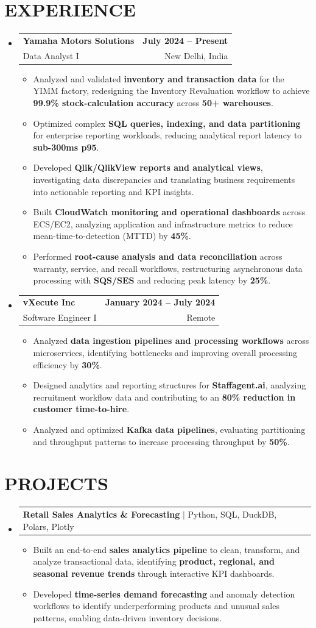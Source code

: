 \documentclass[letterpaper,10pt]{article}
\makeatletter
\renewcommand{\normalsize}{%
  \fontsize{10.1}{12.25}\selectfont
}
\newcommand{\resumeItem}[1]{
  \item\normalsize{
    {#1}
  }
}
\newcommand{\resumeSubheading}[4]{
  \item
    \begin{tabular*}{1.0\textwidth}[t]{l@{\extracolsep{\fill}}r}
      \textbf{\normalsize#1} & \textbf{\normalsize#2} \\
      {\normalsize#3} & {\normalsize#4} \\
    \end{tabular*}\vspace{1pt}
}
\newcommand{\resumeProjectHeading}[2]{
  \item
    \begin{tabular*}{1.0\textwidth}{l@{\extracolsep{\fill}}r}
      \normalsize#1 & \textbf{\normalsize#2}\\
    \end{tabular*}\vspace{2pt}
}
\newcommand{\resumeSubHeadingListStart}{\begin{itemize}[leftmargin=0.0in, label={}, itemsep=6pt, topsep=2pt]}
\newcommand{\resumeSubHeadingListEnd}{\end{itemize}}
\newcommand{\resumeItemListStart}{\begin{itemize}}
\newcommand{\resumeItemListEnd}{\end{itemize}\vspace{-3pt}}
\makeatother
\begin{document}
\section{EXPERIENCE}
  \resumeSubHeadingListStart

    \resumeSubheading
      {Yamaha Motors Solutions}{July 2024 -- Present}
      {Data Analyst I}{New Delhi, India}
      \resumeItemListStart
        \resumeItem{Analyzed and validated \textbf{inventory and transaction data} for the YIMM factory, redesigning the Inventory Revaluation workflow to achieve \textbf{99.9\% stock-calculation accuracy} across \textbf{50+ warehouses}.}
        \resumeItem{Optimized complex \textbf{SQL queries, indexing, and data partitioning} for enterprise reporting workloads, reducing analytical report latency to \textbf{sub-300ms p95}.}
        \resumeItem{Developed \textbf{Qlik/QlikView reports and analytical views}, investigating data discrepancies and translating business requirements into actionable reporting and KPI insights.}
        \resumeItem{Built \textbf{CloudWatch monitoring and operational dashboards} across ECS/EC2, analyzing application and infrastructure metrics to reduce mean-time-to-detection (MTTD) by \textbf{45\%}.}
        \resumeItem{Performed \textbf{root-cause analysis and data reconciliation} across warranty, service, and recall workflows, restructuring asynchronous data processing with \textbf{SQS/SES} and reducing peak latency by \textbf{25\%}.}
      \resumeItemListEnd

    \resumeSubheading
      {vXecute Inc}{January 2024 -- July 2024}
      {Software Engineer I}{Remote}
      \resumeItemListStart
        \resumeItem{Analyzed \textbf{data ingestion pipelines and processing workflows} across microservices, identifying bottlenecks and improving overall processing efficiency by \textbf{30\%}.}
        \resumeItem{Designed analytics and reporting structures for \textbf{Staffagent.ai}, analyzing recruitment workflow data and contributing to an \textbf{80\% reduction in customer time-to-hire}.}
        \resumeItem{Analyzed and optimized \textbf{Kafka data pipelines}, evaluating partitioning and throughput patterns to increase processing throughput by \textbf{50\%}.}
      \resumeItemListEnd

  \resumeSubHeadingListEnd

\section{PROJECTS}
  \resumeSubHeadingListStart
    \resumeProjectHeading
      {\textbf{Retail Sales Analytics \& Forecasting} $|$ \textnormal{Python, SQL, DuckDB, Polars, Plotly}}{}
      \resumeItemListStart
        \resumeItem{Built an end-to-end \textbf{sales analytics pipeline} to clean, transform, and analyze transactional data, identifying \textbf{product, regional, and seasonal revenue trends} through interactive KPI dashboards.}
        \resumeItem{Developed \textbf{time-series demand forecasting} and anomaly detection workflows to identify underperforming products and unusual sales patterns, enabling data-driven inventory decisions.}
      \resumeItemListEnd
  \resumeSubHeadingListEnd
\end{document}
